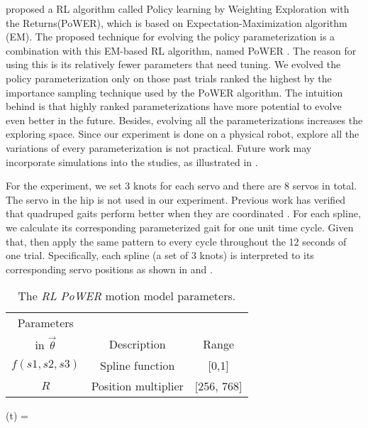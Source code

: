 \cite{kober2009learning-motor-primitives} proposed a RL algorithm
called Policy learning by Weighting Exploration with the
Returns(PoWER), which is based on Expectation-Maximization algorithm
(EM). The proposed technique for evolving the policy parameterization
is a combination with this EM-based RL algorithm, named PoWER \cite{kober2009learning-motor-primitives}. The reason for using this is its relatively fewer parameters that need tuning. We
evolved the policy parameterization only on those past trials ranked
the highest by the importance sampling technique used by the PoWER
algorithm. The intuition behind is that highly ranked
parameterizations have more potential to evolve even better in the
future. Besides, evolving all the parameterizations increases the exploring space. Since our experiment
is done on a physical robot, explore all the variations of every
parameterization is not practical. Future work may incorporate simulations into the studies, as illustrated in \cite{bongard2006resilient-machines-through}.

For the experiment, we set 3 knots for each servo and there are 8
servos in total. The servo in the hip is not used in
our experiment. Previous work has verified that quadruped gaits
perform better when they are coordinated \cite{clune2009evolving-coordinated-quadruped, clune2011on-the-performance-of-indirect-encoding, valsalam2008modular-neuroevolution-for-multilegged}. For each spline, we calculate its corresponding parameterized gait for one unit time cycle. Given that, then apply the same
pattern to every cycle throughout the 12 seconds of one
trial. Specifically, each spline (a set of 3 knots) is interpreted to its corresponding servo positions as shown in  and .

\begin{table}[h]
\begin{center}
\begin{tabular}{|c|c|c|}
\hline
Parameters        &                           &       \\
in $\vec{\theta}$ & Description               & Range \\
\hline
\hline
$f(s1,s2,s3)$        & Spline function           & [0,1] \\  %
\hline
$R$          & Position multiplier                & [256, 768] \\
\hline
\end{tabular}
\caption{The \emph{RL PoWER} motion model parameters.}
\end{center}
\end{table}


\be
{}(t) =
\ee


